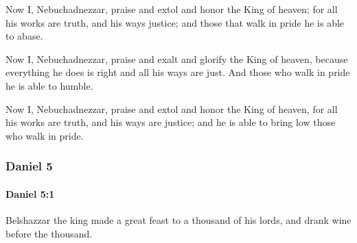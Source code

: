 			\begin{versebox}
					\item[BHS] 
					\item[ASV] Now I, Nebuchadnezzar, praise and extol and honor the King of heaven; for all his works are truth, and his ways justice; and those that walk in pride he is able to abase.
					\item[NIV] Now I, Nebuchadnezzar, praise and exalt and glorify the King of heaven, because everything he does is right and all his ways are just. And those who walk in pride he is able to humble.
					\item[NRSV] Now I, Nebuchadnezzar, praise and extol and honor the King of heaven, for all his works are truth, and his ways are justice; and he is able to bring low those who walk in pride.
			\end{versebox}
	\subsubsection{Daniel 5} %
		\label{DANIEL-5}

		\paragraph{Daniel 5:1} %
			\label{DANIEL-5-1}

			Belshazzar the king made a great feast to a thousand of his lords, and drank wine before the thousand.

